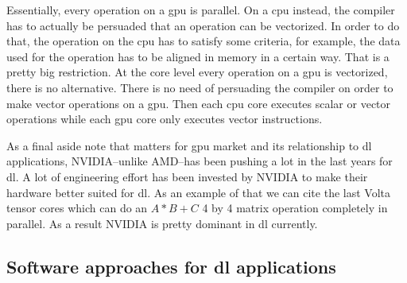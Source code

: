 \documentclass[11pt,a4paper]{article}
\begin{document}
Essentially, every operation on a \gls{gpu} is parallel. On a \gls{cpu} instead, the compiler has to actually be persuaded that an operation can be vectorized. In order to do that, the operation on the \gls{cpu} has to satisfy some criteria, for example, the data used for the operation has to be aligned in memory in a certain way. That is a pretty big restriction. At the core level every operation on a \gls{gpu} is vectorized, there is no alternative. There is no need of persuading the compiler on order to make vector operations on a \gls{gpu}. Then each \gls{cpu} core executes scalar or vector operations while each \gls{gpu} core only executes vector instructions. 

As a final aside note that matters for \gls{gpu} market and its relationship to \gls{dl} applications, NVIDIA--unlike AMD--has been pushing a lot in the last years for \gls{dl}. A lot of engineering effort has been invested by NVIDIA to make their hardware better suited for \gls{dl}. As an example of that we can cite the last Volta tensor cores which can do an $A*B+C$ 4 by 4 matrix operation completely in parallel. As a result NVIDIA is pretty dominant in \gls{dl} currently.





















































\subsection{Software approaches for \gls{dl} applications}
\end{document}

